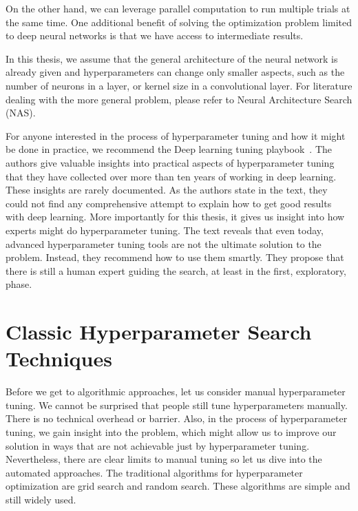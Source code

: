 On the other hand, we can leverage parallel computation to run multiple trials at the same time. One additional benefit of solving the optimization problem limited to deep neural networks is that we have access to intermediate results.


In this thesis, we assume that the general architecture of the neural network is already given and hyperparameters can change only smaller aspects, such as the number of neurons in a layer, or kernel size in a convolutional layer. For literature dealing with the more general problem, please refer to Neural Architecture Search (NAS).

For anyone interested in the process of hyperparameter tuning and how it might be done in practice, we recommend the Deep learning tuning playbook~\cite{tuningplaybookgithub}. The authors give valuable insights into practical aspects of hyperparameter tuning that they have collected over more than ten years of working in deep learning. These insights are rarely documented. As the authors state in the text, they could not find any comprehensive attempt to explain how to get good results with deep learning. More importantly for this thesis, it gives us insight into how experts might do hyperparameter tuning. The text reveals that even today, advanced hyperparameter tuning tools are not the ultimate solution to the problem. Instead, they recommend how to use them smartly. They propose that there is still a human expert guiding the search, at least in the first, exploratory, phase.



\section{Classic Hyperparameter Search Techniques}
Before we get to algorithmic approaches, let us consider manual hyperparameter tuning. We cannot be surprised that people still tune hyperparameters manually. There is no technical overhead or barrier. Also, in the process of hyperparameter tuning, we gain insight into the problem, which might allow us to improve our solution in ways that are not achievable just by hyperparameter tuning. Nevertheless, there are clear limits to manual tuning so let us dive into the automated approaches. The traditional algorithms for hyperparameter optimization are grid search and random search. These algorithms are simple and still widely used.

